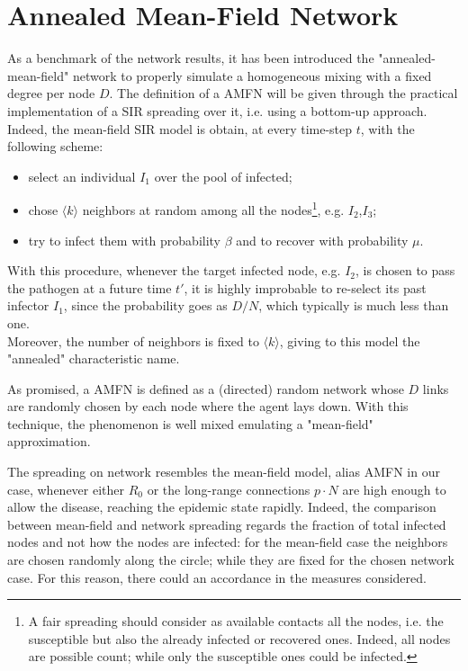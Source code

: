 \documentclass[a4paper,10pt,twoside]{book} %
\theoremstyle{definition}
\begin{document}
\section*{Annealed Mean-Field Network}
\label{sec:Annealed_MF_Network}
As a benchmark of the network results, it has been introduced the "annealed-mean-field" network to properly simulate a homogeneous mixing with a fixed degree per node $D$. %
The definition of a AMFN will be given through the practical implementation of a SIR spreading over it, i.e. using a bottom-up approach.
Indeed, the mean-field SIR model is obtain, at every time-step $t$, with the following scheme: 
\begin{itemize}
	\item select an individual $I_1$ over the pool of infected;
	\item chose $\langle k \rangle$ neighbors at random among all the nodes\footnote{A fair spreading should consider as available contacts all the nodes, i.e. the susceptible but also the already infected or recovered ones. Indeed, all nodes are possible count; while only the susceptible ones could be infected.}, e.g. $I_2$,$I_3$;
	\item try to infect them with probability $\beta$ and to recover with probability $\mu$.
\end{itemize}
With this procedure, whenever the target infected node, e.g. $I_2$, is chosen to pass the pathogen at a future time $t'$, it is highly improbable to re-select its past infector $I_1$, since the probability goes as $D/N$, which typically is much less than one. 
\\Moreover, the number of neighbors is fixed to $\langle k \rangle$, giving to this model the "annealed" characteristic name.

As promised, a AMFN is defined as a (directed) random network whose $D$ links are randomly chosen by each node where the agent lays down. With this technique, the phenomenon is well mixed emulating a "mean-field" approximation.

The spreading on network resembles the mean-field model, alias AMFN in our case, whenever either $R_0$ or the long-range connections $p \cdot N$ are high enough to allow the disease, reaching the epidemic state rapidly. Indeed, the comparison between mean-field and network spreading regards the fraction of total infected nodes and not how the nodes are infected: for the mean-field case the neighbors are chosen randomly along the circle; while they are fixed for the chosen network case. For this reason, there could an accordance in the measures considered.
\end{document}
